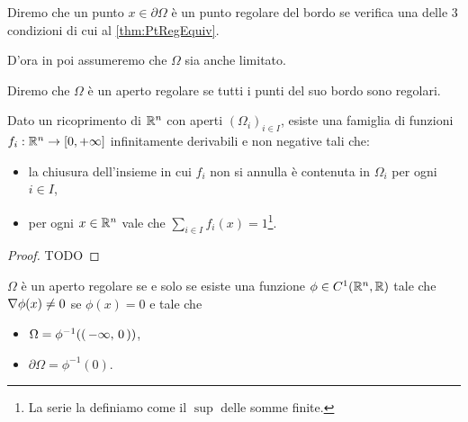 \begin{definition}
	Diremo che un punto $x\in \partial \Omega$ è un punto regolare del bordo se verifica una delle $3$ condizioni di cui
	al \cref{thm:PtRegEquiv}.
\end{definition}

D'ora in poi assumeremo che $\Omega$ sia anche limitato.

\begin{definition}
	Diremo che $\Omega$ è un aperto regolare se tutti i punti del suo bordo sono regolari.
\end{definition}


\begin{theorem}\label{thm:PartizioneUnita}
	Dato un ricoprimento di $\mathbb R^n$ con aperti $(\Omega_i)_{i\in I}$, esiste una famiglia di funzioni $f_i:\mathbb R^n\to[0,+\infty]$ infinitamente derivabili
	e non negative tali che:
	\begin{itemize}
		\item la chiusura dell'insieme in cui $f_i$ non si annulla è contenuta in $\Omega_i$ per ogni $i\in I$,
		\item per ogni $x\in\mathbb R^n$ vale che $\sum_{i\in I} f_i(x)=1$\footnote{La serie la definiamo come il $\sup$ delle somme finite.}.
	\end{itemize}
\end{theorem}
\begin{proof}
	TODO
\end{proof}

\begin{lemma}\label{lemma:EquivRegolare}
	$\Omega$ è un aperto regolare se e solo se esiste una funzione $\phi\in C^1(\mathbb R^n,\mathbb R)$ tale che $\nabla \phi(x)\neq 0$ se $\phi(x)=0$ e tale che
	\begin{itemize}
		\item $\Omega = \phi^{-1}(\left(\,-\infty,\,0\,\right))$,
		\item $\partial \Omega = \phi^{-1}(0)$.
	\end{itemize}
\end{lemma}

